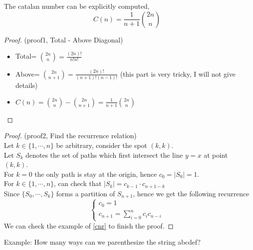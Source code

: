 \begin{theorem}
    The catalan number can be explicitly computed,
    $$C(n)=\frac{1}{n+1}{2n \choose n}$$
\end{theorem}
\begin{proof}
(proof1, Total - Above Diagonal)
\begin{itemize}
    \item Total= ${2n \choose n}= \frac{(2n)!}{n!n!}$
    \item Above= ${2n \choose n+1}= \frac{(2n)!}{(n+1)!(n-1)!}$ (this part is very tricky, I will not give details)
    \item $C(n)={2n \choose n}-{2n \choose n+1}=\frac{1}{n+1}{2n \choose n}$
\end{itemize}
\end{proof}
\begin{proof}
(proof2, Find the recurrence relation)\\
Let $k \in \{1, \cdots ,n\}$ be arbitrary, consider the spot $(k,k)$.\\
Let $S_k$ denotes the set of paths which first intersect the line $y=x$ at point $(k,k)$.\\
For $k=0$ the only path is stay at the origin, hence $c_0=|S_0|=1$.\\
For $k \in \{1, \cdots ,n\}$, can check that $|S_k|=c_{k-1} \cdot c_{n+1-k}$\\
Since $\{S_0, \cdots ,S_k\}$ forms a partition of $S_{n+1}$, hence we get the following recurrence
\begin{equation}
    \begin{cases}
        c_0=1\\
        c_{n+1}=\sum_{i=0}^{n}c_ic_{n-i}
    \end{cases}
\end{equation}
We can check the example of \ref{cnr} to finish the proof.
\end{proof}
\noindent Example: How many ways can we parenthesize the string abcdef?